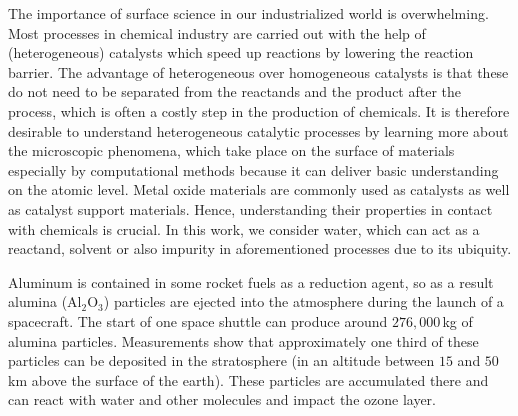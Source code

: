\documentclass[11pt,DIV=13,BCOR=5mm,a4paper,headinclude]{scrbook}
\begin{document}
The importance of surface science in our industrialized world is overwhelming.
Most processes in chemical industry are carried out with the help of (heterogeneous) catalysts\cite{Ago2005,Cargnello2012,Knozinger1978} which speed up reactions by lowering the reaction barrier.
The advantage of heterogeneous over homogeneous catalysts is that these do not need to be separated from the reactands and the product after the process, which is often a costly step in the production of chemicals.
It is therefore desirable to understand heterogeneous catalytic processes by learning more about the microscopic phenomena, which take place on the surface of materials especially by computational methods because it can deliver basic understanding on the atomic level.
Metal oxide materials are commonly used as catalysts as well as catalyst support materials.
Hence, understanding their properties in contact with chemicals is crucial.
In this work, we consider water, which can act as a reactand, solvent or also impurity in aforementioned processes due to its ubiquity.


Aluminum is contained in some rocket fuels as a reduction agent, so as a result alumina (Al$_2$O$_3$) particles are ejected into the atmosphere during the launch of a spacecraft\cite{Elam1998}.
The start of one space shuttle can produce around $276,000\,$kg of alumina particles\cite{Potter1978}.
Measurements show that approximately one third of these particles can be deposited in the stratosphere\cite{Cofer1978} (in an altitude between $15$ and $50\,$km above the surface of the earth).
These particles are accumulated there and can react with water and other molecules\cite{Jones1995,Jackman1996} and impact the ozone layer.
\end{document}
